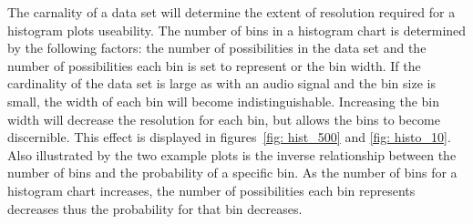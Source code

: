 \documentclass[paper=a4, fontsize=11pt]{scrartcl} %
\numberwithin{equation}{section} %
\numberwithin{figure}{section} %
\numberwithin{table}{section} %
\begin{document}
The carnality of a data set will determine the extent of resolution required for a histogram plots useability. The number of bins in a histogram chart is determined by the following factors: the number of possibilities in the data set and the number of possibilities each bin is set to represent or the bin width. If the cardinality of the data set is large as with an audio signal and the bin size is small, the width of each bin will become indistinguishable. Increasing the bin width will decrease the resolution for each bin, but allows the bins to become discernible. This effect is displayed in figures~\ref{fig: hist_500} and \ref{fig: histo_10}. Also illustrated by the two example plots is the inverse relationship between the number of bins and the probability of a specific bin. As the number of bins for a histogram chart increases, the number of possibilities each bin represents decreases thus the probability for that bin decreases. 
\end{document}
